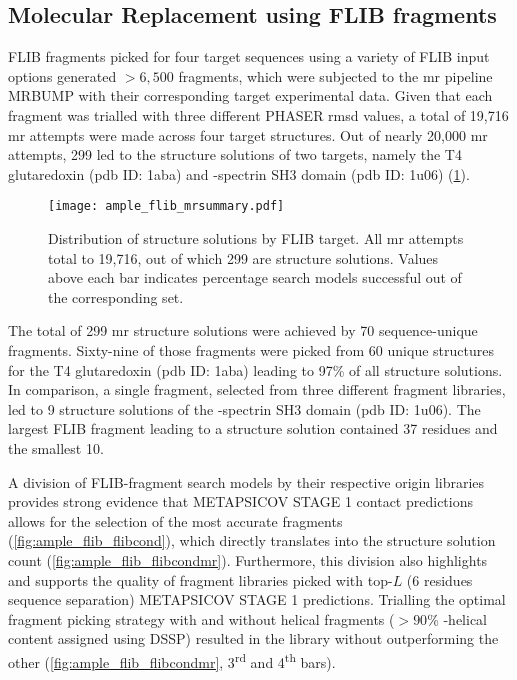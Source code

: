 \subsection{Molecular Replacement using FLIB fragments}
FLIB fragments picked for four target sequences using a variety of FLIB input options generated $>6,500$ fragments, which were subjected to the \gls{mr} pipeline MRBUMP with their corresponding target experimental data. Given that each fragment was trialled with three different PHASER \gls{rmsd} values, a total of 19,716 \gls{mr} attempts were made across four target structures. Out of nearly 20,000 \gls{mr} attempts, 299 led to the structure solutions of two targets, namely the T4 glutaredoxin (\gls{pdb} ID: 1aba) and \textalpha-spectrin SH3 domain (\gls{pdb} ID: 1u06) (\cref{fig:ample_flib_mrsummary}).

\begin{figure}[H]
	\centering
	\texttt{[image: ample\_flib\_mrsummary.pdf]}
	\caption[MR structure solutions by FLIB target]{Distribution of structure solutions by FLIB target. All \gls{mr} attempts total to 19,716, out of which 299 are structure solutions. Values above each bar indicates percentage search models successful out of the corresponding set.}
	\label{fig:ample_flib_mrsummary}
\end{figure}

The total of 299 \gls{mr} structure solutions were achieved by 70 sequence-unique fragments. Sixty-nine of those fragments were picked from 60 unique structures for the T4 glutaredoxin (\gls{pdb} ID: 1aba) leading to 97\% of all structure solutions. In comparison, a single fragment, selected from three different fragment libraries, led to 9 structure solutions of the \textalpha-spectrin SH3 domain (\gls{pdb} ID: 1u06). The largest FLIB fragment leading to a structure solution contained 37 residues and the smallest 10.

A division of FLIB-fragment search models by their respective origin libraries provides strong evidence that METAPSICOV STAGE 1 contact predictions allows for the selection of the most accurate fragments (\cref{fig:ample_flib_flibcond}), which directly translates into the structure solution count (\cref{fig:ample_flib_flibcondmr}). Furthermore, this division also highlights and supports the quality of fragment libraries picked with top-$L$ (6 residues sequence separation) METAPSICOV STAGE 1 predictions. Trialling the optimal fragment picking strategy with and without helical fragments ($>90$\% \textalpha-helical content assigned using DSSP) resulted in the library without outperforming the other (\cref{fig:ample_flib_flibcondmr}, 3\textsuperscript{rd} and 4\textsuperscript{th} bars). 

